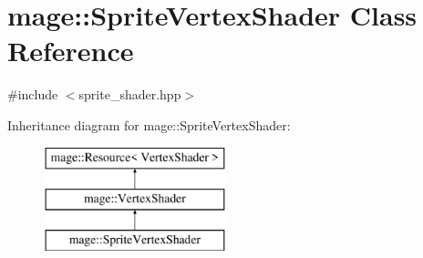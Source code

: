 \hypertarget{classmage_1_1_sprite_vertex_shader}{}\section{mage\+:\+:Sprite\+Vertex\+Shader Class Reference}
\label{classmage_1_1_sprite_vertex_shader}


{\ttfamily \#include $<$sprite\+\_\+shader.\+hpp$>$}

Inheritance diagram for mage\+:\+:Sprite\+Vertex\+Shader\+:\begin{figure}[H]
\begin{center}
\leavevmode
\includegraphics[height=3.000000cm]{classmage_1_1_sprite_vertex_shader}
\end{center}
\end{figure}
